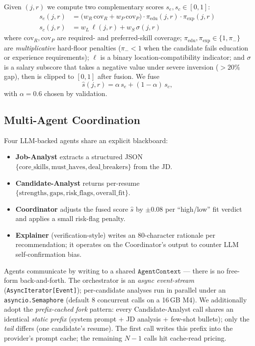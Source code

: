 \documentclass[11pt]{article}
\begin{document}
Given $(j, r)$ we compute two complementary scores
$s_e, s_c \in [0,1]$:
\begin{align}
s_e(j, r) &= \big(w_R\,\text{cov}_R + w_P\,\text{cov}_P\big)
            \cdot \pi_\text{edu}(j, r) \cdot \pi_\text{exp}(j, r) \\
s_c(j, r) &= w_L\,\ell(j, r) + w_S\,\sigma(j, r)
\end{align}
where $\text{cov}_R, \text{cov}_P$ are required- and preferred-skill
coverage; $\pi_\text{edu}, \pi_\text{exp} \in \{1, \pi_-\}$ are
\emph{multiplicative} hard-floor penalties ($\pi_- < 1$ when the
candidate fails education or experience requirements);
$\ell$ is a binary location-compatibility indicator; and $\sigma$ is
a salary subscore that takes a negative value under severe inversion
($> 20\%$ gap), then is clipped to $[0,1]$ after fusion.
We fuse
\begin{equation}
\hat{s}(j, r) = \alpha\,s_e + (1-\alpha)\,s_c,
\end{equation}
with $\alpha = 0.6$ chosen by validation.

\subsection{Multi-Agent Coordination}
\label{sec:method-agents}

Four LLM-backed agents share an explicit blackboard:

\begin{itemize}
\item \textbf{Job-Analyst} extracts a structured JSON
      $\{\text{core\_skills}, \text{must\_haves}, \text{deal\_breakers}\}$
      from the JD.
\item \textbf{Candidate-Analyst} returns per-resume
      $\{\text{strengths}, \text{gaps}, \text{risk\_flags},
      \text{overall\_fit}\}$.
\item \textbf{Coordinator} adjusts the fused score
      $\hat{s}$ by $\pm 0.08$ per ``high/low'' fit verdict and applies
      a small risk-flag penalty.
\item \textbf{Explainer} (verification-style) writes an
      80-character rationale per recommendation; it operates on the
      Coordinator's output to counter LLM self-confirmation bias.
\end{itemize}

Agents communicate by writing to a shared
$\mathtt{AgentContext}$ — there is no free-form back-and-forth.
The orchestrator is an \emph{async event-stream}
(\texttt{AsyncIterator[Event]}); per-candidate analyses run in
parallel under an \texttt{asyncio.Semaphore} (default 8 concurrent
calls on a 16\,GB M4). We additionally adopt the
\emph{prefix-cached fork} pattern: every Candidate-Analyst call shares
an identical \emph{static prefix} (system prompt + JD analysis +
few-shot bullets); only the \emph{tail} differs (one candidate's
resume). The first call writes this prefix into the provider's prompt
cache; the remaining $N{-}1$ calls hit cache-read pricing.
\end{document}
